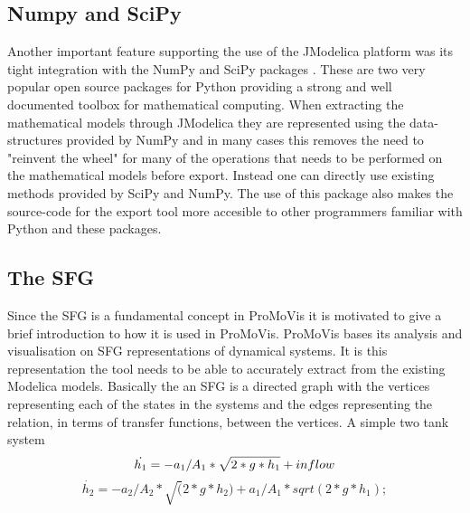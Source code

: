 \subsection{Numpy and SciPy}
Another important feature supporting the use of the JModelica platform was its tight integration with the NumPy and SciPy packages \cite{scipyorg}\nocite{*}. These are two very popular open source packages for Python providing a strong and well documented toolbox for mathematical computing. When extracting the mathematical models through JModelica they are represented using the data-structures provided by NumPy and in many cases this removes the need to "reinvent the wheel" for many of the operations that needs to be performed on the mathematical models before export. Instead one can directly use existing methods provided by SciPy and NumPy. The use of this package also makes the source-code for the export tool more accesible to other programmers familiar with Python and these packages.
\subsection{The SFG}
Since the SFG is a fundamental concept in ProMoVis it is motivated to give a brief introduction to how it is used in ProMoVis. ProMoVis bases its analysis and visualisation on SFG representations of dynamical systems. It is this representation the tool needs to be able to accurately extract from the existing Modelica models. Basically the an SFG is a directed graph with the vertices representing each of the states in the systems and the edges representing the relation, in terms of transfer functions, between the vertices. A simple two tank system
\begin{equation}
    \dot{h_1} = -a_1/A_1*\sqrt{2*g*h_1} + inflow\\\newline
\end{equation}
\begin{equation}
	\dot{h_2} = -a_2/A_2*\sqrt(2*g*h_2) + a_1/A_1*sqrt(2*g*h_1);
\end{equation}